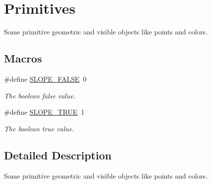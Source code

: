 \hypertarget{group__Primitives}{\section{Primitives}
\label{group__Primitives}
}


Some primitive geometric and visible objects like points and colors.  


\subsection*{Macros}
\begin{DoxyCompactItemize}
\item 
\hypertarget{group__Primitives_gae6284087e258abab2709107da8deef10}{\#define \hyperlink{group__Primitives_gae6284087e258abab2709107da8deef10}{S\+L\+O\+P\+E\+\_\+\+F\+A\+L\+S\+E}~0}\label{group__Primitives_gae6284087e258abab2709107da8deef10}

\begin{DoxyCompactList}\small\item\em The boolean false value. \end{DoxyCompactList}\item 
\hypertarget{group__Primitives_gaf4724331c7139c35a340ef6c34d1d5b8}{\#define \hyperlink{group__Primitives_gaf4724331c7139c35a340ef6c34d1d5b8}{S\+L\+O\+P\+E\+\_\+\+T\+R\+U\+E}~1}\label{group__Primitives_gaf4724331c7139c35a340ef6c34d1d5b8}

\begin{DoxyCompactList}\small\item\em The boolean true value. \end{DoxyCompactList}\end{DoxyCompactItemize}


\subsection{Detailed Description}
Some primitive geometric and visible objects like points and colors. 

